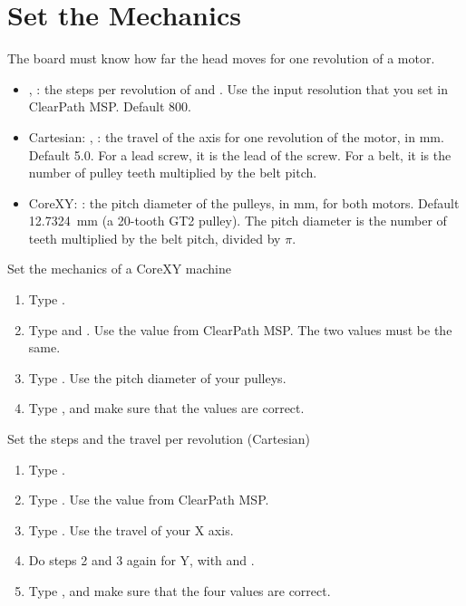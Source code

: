 \section{Set the Mechanics}

The board must know how far the head moves for one revolution of a motor.

\begin{itemize}
  \item {}, : the steps per revolution of
         and . Use the input resolution that you set in
        ClearPath MSP. Default 800.
  \item Cartesian: , : the travel of the axis for
        one revolution of the motor, in mm. Default 5.0. For a lead screw, it
        is the lead of the screw. For a belt, it is the number of pulley teeth
        multiplied by the belt pitch.
  \item CoreXY: : the pitch diameter of the pulleys, in
        mm, for both motors. Default \SI{12.7324}{mm} (a 20-tooth GT2 pulley).
        The pitch diameter is the number of teeth multiplied by the belt
        pitch, divided by $\pi$.
\end{itemize}

\begin{procedure}{Set the mechanics of a CoreXY machine}
\begin{enumerate}
  \item Type .
  \item Type  and . Use the
        value from ClearPath MSP. The two values must be the same.
  \item Type . Use the pitch diameter of your
        pulleys.
  \item Type , and make sure that the values are correct.
\end{enumerate}
\end{procedure}

\begin{procedure}{Set the steps and the travel per revolution (Cartesian)}
\begin{enumerate}
  \item Type .
  \item Type . Use the value from ClearPath MSP.
  \item Type . Use the travel of your X axis.
  \item Do steps 2 and 3 again for Y, with  and .
  \item Type , and make sure that the four values are correct.
\end{enumerate}
\end{procedure}

